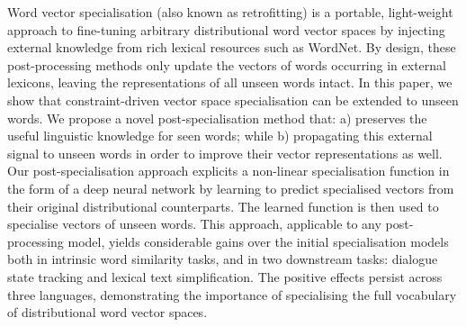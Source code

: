 Word vector specialisation (also known as retrofitting) is a portable, light-weight approach to fine-tuning arbitrary distributional word vector spaces by injecting external knowledge from rich lexical resources such as WordNet. By design, these post-processing methods only update the vectors of words occurring in external lexicons, leaving the representations of all unseen words intact. In this paper, we show that constraint-driven vector space specialisation can be extended to unseen words. We propose a novel  post-specialisation method that: a) preserves the useful linguistic knowledge for seen words; while b) propagating this external signal to unseen words in order to improve their vector representations as well. Our post-specialisation approach explicits a non-linear specialisation function in the form of a deep neural network by learning to predict specialised vectors from their original distributional counterparts. The learned function is then used to specialise vectors of unseen words. This approach, applicable to any post-processing model, yields considerable gains over the initial specialisation models both in intrinsic word similarity tasks, and in two downstream tasks: dialogue state tracking and lexical text simplification. The positive effects persist across three languages, demonstrating the importance of specialising the full vocabulary of distributional word vector spaces.
